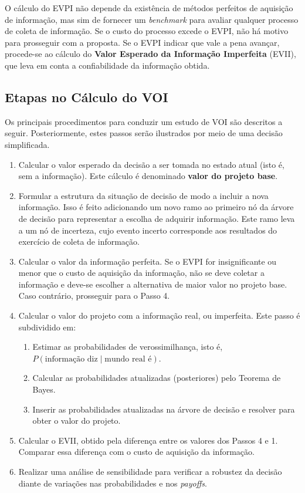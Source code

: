 O cálculo do EVPI não depende da existência de métodos perfeitos de aquisição de informação, mas sim de fornecer um \textit{benchmark} para avaliar qualquer processo de coleta de informação. Se o custo do processo excede o EVPI, não há motivo para prosseguir com a proposta. Se o EVPI indicar que vale a pena avançar, procede-se ao cálculo do \textbf{Valor Esperado da Informação Imperfeita} (EVII), que leva em conta a confiabilidade da informação obtida.

\subsection{Etapas no Cálculo do VOI}

Os principais procedimentos para conduzir um estudo de VOI são descritos a seguir. Posteriormente, estes passos serão ilustrados por meio de uma decisão simplificada.

\begin{enumerate}
    \item Calcular o valor esperado da decisão a ser tomada no estado atual (isto é, sem a informação). Este cálculo é denominado \textbf{valor do projeto base}.
    \item Formular a estrutura da situação de decisão de modo a incluir a nova informação. Isso é feito adicionando um novo ramo ao primeiro nó da árvore de decisão para representar a escolha de adquirir informação. Este ramo leva a um nó de incerteza, cujo evento incerto corresponde aos resultados do exercício de coleta de informação.
    \item Calcular o valor da informação perfeita. Se o EVPI for insignificante ou menor que o custo de aquisição da informação, não se deve coletar a informação e deve-se escolher a alternativa de maior valor no projeto base. Caso contrário, prosseguir para o Passo 4.    
    \item Calcular o valor do projeto com a informação real, ou imperfeita. Este passo é subdividido em:
    \begin{enumerate}
        \item Estimar as probabilidades de verossimilhança, isto é, $P(\text{informação diz} \mid \text{mundo real é})$.
        \item Calcular as probabilidades atualizadas (posteriores) pelo Teorema de Bayes.
        \item Inserir as probabilidades atualizadas na árvore de decisão e resolver para obter o valor do projeto.
    \end{enumerate}
    \item Calcular o EVII, obtido pela diferença entre os valores dos Passos 4 e 1. Comparar essa diferença com o custo de aquisição da informação.
    \item Realizar uma análise de sensibilidade para verificar a robustez da decisão diante de variações nas probabilidades e nos \textit{payoffs}. 
\end{enumerate}


